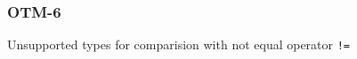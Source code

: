 \subsubsection{OTM-6}\label{sec:error_code_otm_6}

Unsupported types for comparision with not equal operator \texttt{!=}

